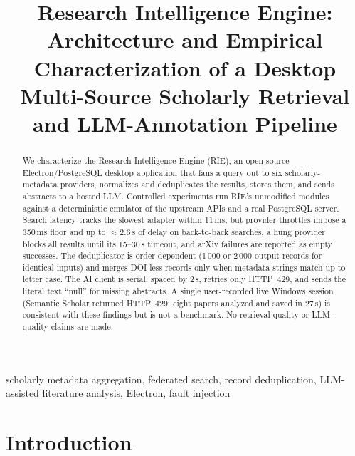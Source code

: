 \documentclass[conference]{IEEEtran}
\begin{document}
\title{Research Intelligence Engine: Architecture and Empirical Characterization of a Desktop Multi-Source Scholarly Retrieval and LLM-Annotation Pipeline}

\author{
\and
{}
}

\maketitle


\begin{abstract}
We characterize the Research Intelligence Engine (RIE), an open-source Electron/PostgreSQL desktop application that fans a query out to six scholarly-metadata providers, normalizes and deduplicates the results, stores them, and sends abstracts to a hosted LLM. Controlled experiments run RIE's unmodified modules against a deterministic emulator of the upstream APIs and a real PostgreSQL server. Search latency tracks the slowest adapter within 11\,ms, but provider throttles impose a 350\,ms floor and up to $\approx$2.6\,s of delay on back-to-back searches, a hung provider blocks all results until its 15--30\,s timeout, and arXiv failures are reported as empty successes. The deduplicator is order dependent (1\,000 or 2\,000 output records for identical inputs) and merges DOI-less records only when metadata strings match up to letter case. The AI client is serial, spaced by 2\,s, retries only HTTP~429, and sends the literal text ``null'' for missing abstracts. A single user-recorded live Windows session (Semantic Scholar returned HTTP~429; eight papers analyzed and saved in 27\,s) is consistent with these findings but is not a benchmark. No retrieval-quality or LLM-quality claims are made.
\end{abstract}

\begin{IEEEkeywords}
scholarly metadata aggregation, federated search, record deduplication, LLM-assisted literature analysis, Electron, fault injection
\end{IEEEkeywords}

\section{Introduction}
\label{sec:intro}
\end{document}
